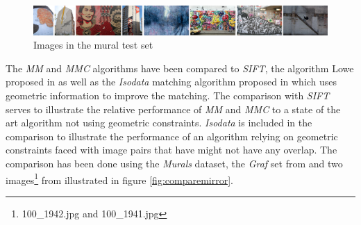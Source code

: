 \documentclass[conference]{IEEEtran}
\begin{document}
\begin{figure}
	\centering
	\includegraphics[width=\textwidth]{images/murals}
	\caption{Images in the mural test set}
	\label{fig:murals}
\end{figure}




%
%
The \emph{MM} and \emph{MMC} algorithms have been compared to 
\emph{SIFT}, the algorithm Lowe proposed in \cite{lowe2004sift} as well 
as the \emph{Isodata} matching algorithm proposed in \cite{das2008event} 
which uses geometric information to improve the matching. The comparison 
with \emph{SIFT} serves to illustrate the relative performance of 
\emph{MM} and \emph{MMC} to a state of the art algorithm not using 
geometric constraints. \emph{Isodata} is included in the comparison to 
illustrate the performance of an algorithm relying on geometric 
constraints faced with image pairs that have might not have any overlap.  
The comparison has been done using the \emph{Murals} dataset, the 
\emph{Graf} set from \cite{mikolajczyk2005performance} and two 
images\footnote{100\_1942.jpg and 100\_1941.jpg} from 
\cite{gallagher2008} illustrated in figure \ref{fig:comparemirror}.
\end{document}
